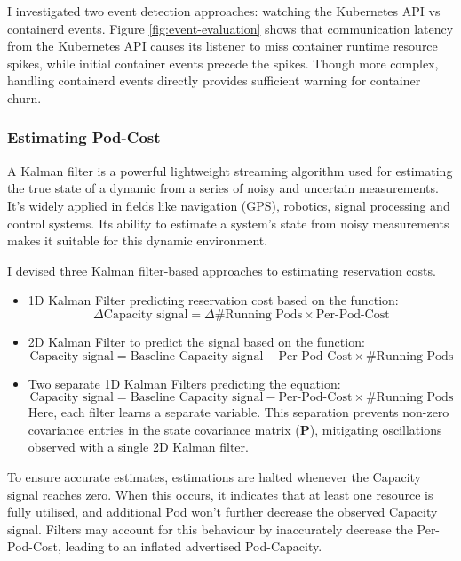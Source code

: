 I investigated two event detection approaches: watching the Kubernetes API vs
containerd events. Figure \ref{fig:event-evaluation} shows that communication
latency from the Kubernetes API causes its listener to miss container runtime
resource spikes, while initial container events precede the spikes. Though more
complex, handling containerd events directly provides sufficient warning for
container churn.

\subsubsection{Estimating Pod-Cost}
\label{sec:estimating-cost}
A Kalman filter \cite{welch1995introduction} is a powerful lightweight streaming algorithm used for
estimating the true state of a dynamic from a series of noisy and uncertain
measurements. It's widely applied in fields like navigation (GPS), robotics,
signal processing and control systems. Its ability to estimate a system's state
from noisy measurements makes it suitable for this dynamic environment.

I devised three Kalman filter-based approaches to estimating reservation costs.
\begin{itemize}
    \item 1D Kalman Filter predicting reservation cost based on the function:
        \[\Delta \text{Capacity signal} = \Delta \text{\# Running Pods} \times
        \text{Per-Pod-Cost}\]
    \item 2D Kalman Filter to predict the signal based on the function:
        \[\text{Capacity signal} = \text{Baseline Capacity signal} - \text{Per-Pod-Cost}
        \times \text{\# Running Pods}\]
    \item Two separate 1D Kalman Filters predicting the equation:
        \[\text{Capacity signal} = \text{Baseline Capacity signal} -
        \text{Per-Pod-Cost} \times \text{\# Running Pods}\]
        Here, each filter learns a separate variable. This separation prevents
        non-zero covariance entries in the state covariance matrix ($\mathbf{P}$),
        mitigating oscillations observed with a single 2D Kalman filter.
\end{itemize}
To ensure accurate estimates, estimations are halted whenever the Capacity signal
reaches zero. When this occurs, it indicates that at least one resource is fully
utilised, and additional Pod won't further decrease the observed Capacity
signal. Filters may account for this behaviour by inaccurately decrease the
Per-Pod-Cost, leading to an inflated advertised Pod-Capacity.

